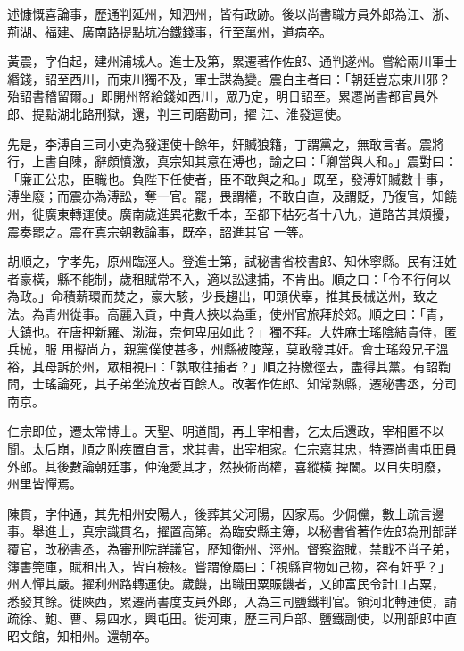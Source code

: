 \begin{pinyinscope}
 述慷慨喜論事，歷通判延州，知泗州，皆有政跡。後以尚書職方員外郎為江、浙、荊湖、福建、廣南路提點坑冶鐵錢事，行至萬州，道病卒。



 黃震，字伯起，建州浦城人。進士及第，累遷著作佐郎、通判遂州。嘗給兩川軍士緡錢，詔至西川，而東川獨不及，軍士謀為變。震白主者曰：「朝廷豈忘東川邪？殆詔書稽留爾。」即開州帑給錢如西川，眾乃定，明日詔至。累遷尚書都官員外郎、提點湖北路刑獄，還，判三司磨勘司，擢
 江、淮發運使。



 先是，李溥自三司小吏為發運使十餘年，奸贓狼籍，丁謂黨之，無敢言者。震將行，上書自陳，辭頗憤激，真宗知其意在溥也，諭之曰：「卿當與人和。」震對曰：「廉正公忠，臣職也。負陛下任使者，臣不敢與之和。」既至，發溥奸贓數十事，溥坐廢；而震亦為溥訟，奪一官。罷，畏謂權，不敢自直，及謂貶，乃復官，知饒州，徙廣東轉運使。廣南歲進異花數千本，至都下枯死者十八九，道路苦其煩擾，震奏罷之。震在真宗朝數論事，既卒，詔進其官
 一等。



 胡順之，字孝先，原州臨涇人。登進士第，試秘書省校書郎、知休寧縣。民有汪姓者豪橫，縣不能制，歲租賦常不入，適以訟逮捕，不肯出。順之曰：「令不行何以為政。」命積薪環而焚之，豪大駭，少長趨出，叩頭伏辜，推其長械送州，致之法。為青州從事。高麗入貢，中貴人挾以為重，使州官旅拜於郊。順之曰：「青，大鎮也。在唐押新羅、渤海，奈何卑屈如此？」獨不拜。大姓麻士瑤陰結貴侍，匿兵械，服
 用擬尚方，親黨僕使甚多，州縣被陵蔑，莫敢發其奸。會士瑤殺兄子溫裕，其母訴於州，眾相視曰：「孰敢往捕者？」順之持檄徑去，盡得其黨。有詔鞫問，士瑤論死，其子弟坐流放者百餘人。改著作佐郎、知常熟縣，遷秘書丞，分司南京。



 仁宗即位，遷太常博士。天聖、明道間，再上宰相書，乞太后還政，宰相匿不以聞。太后崩，順之附疾置自言，求其書，出宰相家。仁宗嘉其忠，特遷尚書屯田員外郎。其後數論朝廷事，仲淹愛其才，然挾術尚權，喜縱橫
 捭闔。以目失明廢，州里皆憚焉。



 陳貫，字仲通，其先相州安陽人，後葬其父河陽，因家焉。少倜儻，數上疏言邊事。舉進士，真宗識貫名，擢置高第。為臨安縣主簿，以秘書省著作佐郎為刑部詳覆官，改秘書丞，為審刑院詳議官，歷知衛州、涇州。督察盜賊，禁戢不肖子弟，簿書筦庫，賦租出入，皆自檢核。嘗謂僚屬曰：「視縣官物如己物，容有奸乎？」州人憚其嚴。擢利州路轉運使。歲饑，出職田粟賑饑者，又帥富民令計口占粟，
 悉發其餘。徙陜西，累遷尚書度支員外郎，入為三司鹽鐵判官。領河北轉運使，請疏徐、鮑、曹、易四水，興屯田。徙河東，歷三司戶部、鹽鐵副使，以刑部郎中直昭文館，知相州。還朝卒。




\end{pinyinscope}
